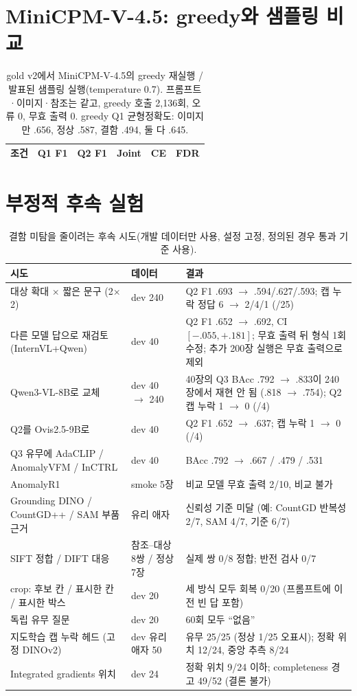 \documentclass[11pt]{article}
\begin{document}
\section{MiniCPM-V-4.5: greedy와 샘플링 비교}
\begin{table}[h]
\centering
\caption{gold v2에서 MiniCPM-V-4.5의 greedy 재실행 / 발표된 샘플링 실행(temperature 0.7). 프롬프트·이미지·참조는 같고, greedy 호출 2,136회, 오류 0, 무효 출력 0. greedy Q1 균형정확도: 이미지만 .656, 정상 .587, 결함 .494, 둘 다 .645.}
\label{tab:minicpm}
\small
\begin{tabular}{lrrrrr}
\toprule
조건 & Q1 F1 & Q2 F1 & Joint & CE & FDR \\
\midrule

\bottomrule
\end{tabular}
\end{table}

\section{부정적 후속 실험}
\begin{table}[h]
\centering
\caption{결함 미탐을 줄이려는 후속 시도(개발 데이터만 사용, 설정 고정, 정의된 경우 통과 기준 사용).}
\label{tab:negative}
\small
\begin{tabular}{p{4.3cm}p{2.2cm}p{6.8cm}}
\toprule
시도 & 데이터 & 결과 \\
\midrule
대상 확대 $\times$ 짧은 문구 (2$\times$2) & dev 240 & Q2 F1 .693 $\rightarrow$ .594/.627/.593; 캡 누락 정답 6 $\rightarrow$ 2/4/1 (/25) \\
다른 모델 답으로 재검토 (InternVL+Qwen) & dev 40 & Q2 F1 .652 $\rightarrow$ .692, CI $[-.055,+.181]$; 무효 출력 뒤 형식 1회 수정; 추가 200장 실행은 무효 출력으로 제외 \\
Qwen3-VL-8B로 교체 & dev 40 $\rightarrow$ 240 & 40장의 Q3 BAcc .792 $\rightarrow$ .833이 240장에서 재현 안 됨 (.818 $\rightarrow$ .754); Q2 캡 누락 1 $\rightarrow$ 0 (/4) \\
Q2를 Ovis2.5-9B로 & dev 40 & Q2 F1 .652 $\rightarrow$ .637; 캡 누락 1 $\rightarrow$ 0 (/4) \\
Q3 유무에 AdaCLIP / AnomalyVFM / InCTRL & dev 40 & BAcc .792 $\rightarrow$ .667 / .479 / .531 \\
AnomalyR1 & smoke 5장 & 비교 모델 무효 출력 2/10, 비교 불가 \\
Grounding DINO / CountGD++ / SAM 부품 근거 & 유리 애자 & 신뢰성 기준 미달 (예: CountGD 반복성 2/7, SAM 4/7, 기준 6/7) \\
SIFT 정합 / DIFT 대응 & 참조–대상 8쌍 / 정상 7장 & 실제 쌍 0/8 정합; 반전 검사 0/7 \\
crop: 후보 칸 / 표시한 칸 / 표시한 박스 & dev 20 & 세 방식 모두 회복 0/20 (프롬프트에 이전 빈 답 포함) \\
독립 유무 질문 & dev 20 & 60회 모두 ``없음'' \\
지도학습 캡 누락 헤드 (고정 DINOv2) & dev 유리 애자 50 & 유무 25/25 (정상 1/25 오표시); 정확 위치 12/24, 중앙 추측 8/24 \\
Integrated gradients 위치 & dev 24 & 정확 위치 9/24 이하; completeness 경고 49/52 (결론 불가) \\
\bottomrule
\end{tabular}
\end{table}
\end{document}
